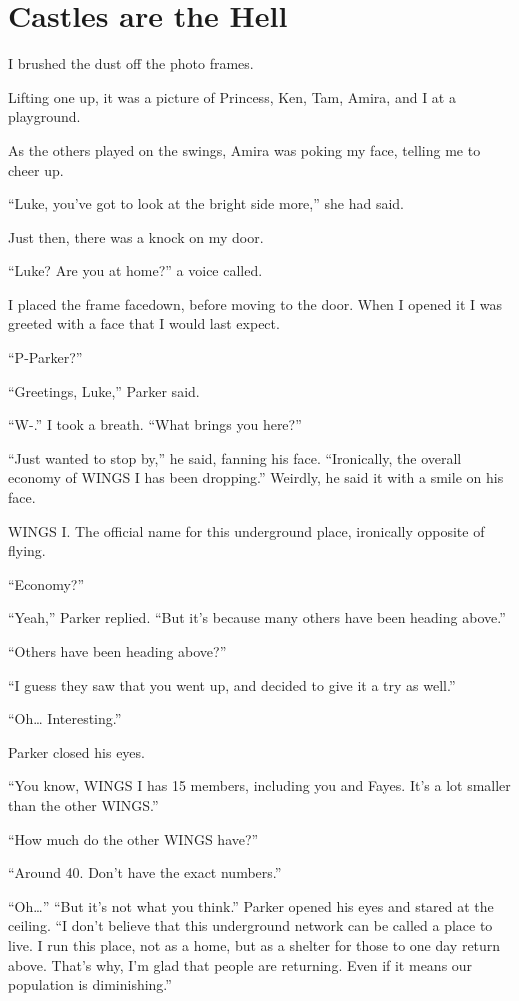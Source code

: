 \section{Castles are the Hell}
I brushed the dust off the photo frames.

Lifting one up, it was a picture of Princess, Ken, Tam, Amira, and I at a playground.

As the others played on the swings, Amira was poking my face, telling me to cheer up. 

“Luke, you’ve got to look at the bright side more,” she had said.

Just then, there was a knock on my door.

“Luke? Are you at home?” a voice called.

I placed the frame facedown, before moving to the door. When I opened it I was greeted with a face that I would last expect.

“P-Parker?”

“Greetings, Luke,” Parker said. 

“W-.” I took a breath. “What brings you here?”

“Just wanted to stop by,” he said, fanning his face. “Ironically, the overall economy of WINGS I has been dropping.” Weirdly, he said it with a smile on his face.

WINGS I. The official name for this underground place, ironically opposite of flying.

“Economy?”

“Yeah,” Parker replied. “But it’s because many others have been heading above.”

“Others have been heading above?”

“I guess they saw that you went up, and decided to give it a try as well.”

“Oh… Interesting.”

Parker closed his eyes.

“You know, WINGS I has 15 members, including you and Fayes. It’s a lot smaller than the other WINGS.”

“How much do the other WINGS have?”

“Around 40. Don’t have the exact numbers.”

“Oh…”
“But it’s not what you think.” Parker opened his eyes and stared at the ceiling. “I don’t believe that this underground network can be called a place to live. I run this place, not as a home, but as a shelter for those to one day return above. That’s why, I’m glad that people are returning. Even if it means our population is diminishing.”


